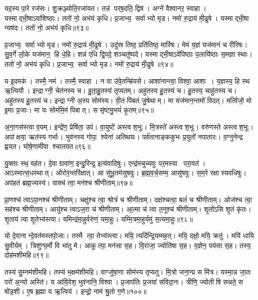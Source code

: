 यद॒स्य पा॒रे रज॑सः।
शु॒क्रञ्ज्योति॒रजा॑यत।
तन्न॑ पर्‌ष॒दति॒ द्विष॑।
अग्ने॑ वैश्वानर॒ स्वाहा।
यस्माद्भी॒षाऽवा॑शिष्ठाः।
ततो॑ नो॒ अभ॑यं कृधि।
प्र॒जाभ्य॒ सर्वाभ्यो मृड।
नमो॑ रु॒द्राय॑ मी॒ढुषे।
यस्माद्भी॒षा न्यष॑दः।
ततो॑ नो॒ अभ॑यं कृधि॥९३॥

प्र॒जाभ्य॒ सर्वाभ्यो मृड।
नमो॑ रु॒द्राय॑ मी॒ढुषे।
उदु॑स्र तिष्ठ॒ प्रति॑तिष्ठ॒ मारि॑षः।
मेमं य॒ज्ञं यज॑मानं च रीरिषः।
सु॒व॒र्गे लो॒के यज॑मान॒ हि धे॒हि।
शन्न॑ एधि द्वि॒पदे॒ शञ्चतु॑ष्पदे।
यस्माद्भी॒षाऽवे॑पिष्ठाः प॒लायि॑ष्ठाः स॒मज्ञास्थाः।
ततो॑ नो॒ अभ॑यं कृधि।
प्र॒जाभ्य॒ सर्वाभ्यो मृड।
नमो॑ रु॒द्राय॑ मी॒ढुषे॥९४॥

य इ॒दमक॑।
तस्मै॒ नम॑।
तस्मै॒ स्वाहा।
न वा उ॑वे॒तन्म्रि॑यसे।
आशा॑नान्त्वा॒ विश्वा॒ आशा।
य॒ज्ञस्य॒ हि स्थ ऋ॒त्वियौ।
इन्द्राग्नी॒ चेत॑नस्य च।
हु॒ता॒हु॒तस्य॑ तृप्यतम्।
अहु॑तस्य हु॒तस्य॑ च।
हु॒तस्य॒ चाहु॑तस्य च।
अहु॑तस्य हु॒तस्य॑ च।
इन्द्राग्नी अ॒स्य सोम॑स्य।
वी॒तं पि॑बतं जु॒षेथाम्।
मा यज॑मान॒न्तमो॑ विदत्।
मर्त्विजो॒ मो इ॒माः प्र॒जाः।
मा यः सोम॑मि॒मं पिबात्।
ससृ॑ष्टमु॒भयं॑ कृ॒तम्॥९५॥\anuvakamend[कृ॒धि॒ मी॒ढुषेऽहु॑तस्य च स॒प्त च॑]

अ॒ना॒गस॑स्त्वा व॒यम्।
इन्द्रे॑ण॒ प्रेषि॑ता॒ उप॑।
वा॒युष्टे॑ अस्त्वश॒भूः।
मि॒त्रस्ते॑ अस्त्वश॒भूः।
वरु॑णस्ते अस्त्वश॒भूः।
अपांक्षया॒ ऋत॑स्य गर्भाः।
भुव॑नस्य गोपा॒ श्येना॑ अतिथयः।
पर्व॑तानाङ्ककुभः प्र॒युतो॑ नपातारः।
व॒ग्नुनेन्द्र ह्वयत।
घोषे॒णामी॑वा श्चातयत॥९६॥

यु॒क्ताः स्थ॒ वह॑त।
दे॒वा ग्रावा॑ण॒ इन्दु॒रिन्द्र॒ इत्य॑वादिषुः।
एन्द्र॑मचुच्यवुः पर॒मस्या परा॒वत॑।
आऽस्मात्स॒धस्थात्।
ओरोर॒न्तरि॑क्षात्।
आ सु॑भू॒तम॑सुषवुः।
ब्र॒ह्म॒व॒र्च॒सम्म॒ आसु॑षवुः।
स॒म॒रे रक्षास्यवधिषुः।
अप॑हतं ब्रह्म॒ज्यस्य॑।
वाक्च॑ त्वा॒ मन॑श्च श्रीणीताम्॥९७॥

प्रा॒णश्च॑ त्वाऽपा॒नश्च॑ श्रीणीताम्।
चक्षु॑श्च त्वा॒ श्रोत्रं॑ च श्रीणीताम्।
दक्ष॑श्चत्वा॒ बलं॑ च श्रीणीताम्।
ओज॑श्च त्वा॒ सह॑श्च श्रीणीताम्।
आयु॑श्च त्वाऽज॒रा च॑ श्रीणीताम्।
आ॒त्मा च॑ त्वा त॒नूश्च॑ श्रीणीताम्।
शृ॒तो॑ऽसि शृ॒तं कृ॑तः।
शृ॒ताय॑ त्वा शृ॒तेभ्य॑स्त्वा।
यमिन्द्र॑मा॒हुर्वरु॑णं॒ यमा॒हुः।
यम्मि॒त्रमा॒हुर्यमु॑ स॒त्यमा॒हुः॥९८॥

यो दे॒वानान्दे॒वत॑मस्तपो॒जाः।
तस्मै त्वा॒ तेभ्य॑स्त्वा।
मयि॒ त्यदि॑न्द्रि॒यम्मह॒त्।
मयि॒ दक्षो॒ मयि॒ क्रतु॑।
मयि॑ धायि सु॒वीर्यम्।
त्रिशु॑ग्घ॒र्मो वि भा॑तु मे।
आकूत्या॒ मन॑सा स॒ह।
वि॒राजा॒ ज्योति॑षा स॒ह।
य॒ज्ञेन॒ पय॑सा स॒ह।
तस्य॒ दोह॑मशीमहि॥९९॥

तस्य॑ सु॒म्नम॑शीमहि।
तस्य॑ भ॒क्षम॑शीमहि।
वाग्जु॑षा॒णा सोम॑स्य तृप्यतु।
मि॒त्रो जना॒न्प्र स मि॑त्र।
यस्मा॒न्न जा॒तः परो॑ अ॒न्यो अस्ति॑।
य आ॑वि॒वेश॒ भुव॑नानि॒ विश्वा।
प्र॒जाप॑तिः प्र॒जया॑ संविदा॒नः।
त्रीणि॒ ज्योतीषि सचते॒ स षो॑ड॒शी।
ए॒ष ब्र॒ह्मा य ऋ॒त्विय॑।
इन्द्रो॒ नाम॑ श्रु॒तो ग॒णे॥१००॥

